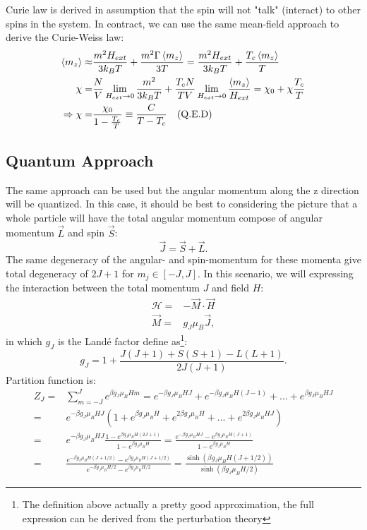 \documentclass[a4paper]{article}
\begin{document}
Curie law is derived in assumption that the spin will not "talk" (interact) to other spins in the system. In contract, we can use the same mean-field approach to derive the Curie-Weiss law:
\begin{align}
	\ev{m_z} \approx& \frac{m^2 H_{ext}}{3k_B T} + \frac{m^2 \Gamma \ev{m_z}}{3T} = \frac{m^2 H_{ext}}{3k_B T} + \frac{T_c\ev{m_z}}{T}\nonumber\\
	\chi =& \frac{N}{V} \lim_{H_{ext} \to 0} \frac{m^2}{3k_B T} + \frac{T_c N}{T V}\lim_{H_{ext} \to 0} \frac{\ev{m_z}}{H_{ext}} = \chi_0 + \chi \frac{T_c}{T}\nonumber\\
	\Rightarrow \chi =& \frac{\chi_0}{1-\frac{T_c}{T}} \equiv \frac{C}{T - T_c} \quad \text{(Q.E.D)}
\end{align} 
\subsection{Quantum Approach}
\quad The same approach can be used but the angular momentum along the z direction will be quantized. In this case, it should be best to considering the picture that a whole particle will have the total angular momentum compose of angular momentum \(\vec{L}\) and spin \(\vec{S}\):
\begin{equation}
	\vec{J} = \vec{S} + \vec{L}.
\end{equation}
\quad The same degeneracy of the angular- and spin-momentum for these momenta give total degeneracy of \(2J + 1\) for \(m_j \in [-J,J]\). In this scenario, we will expressing the interaction between the total momentum \(J\) and field \(H\):
\begin{align}
	\mathcal{H} =& - \vec{M}\cdot\vec{H}\\
	\vec{M} =& g_J \mu_B \vec{J},
\end{align}
in which \(g_J\) is the Landé factor define as\footnote{The definition above actually a pretty good approximation, the full expression can be derived from the perturbation theory}:
\begin{equation}
	g_J = 1 + \frac{J(J+1) + S(S+1) - L(L+1)}{2J(J+1)}.
\end{equation}
\quad Partition function is:
\begin{align}
	Z_J =& \sum_{m = -J}^{J} e^{\beta g_J \mu_B H m} = e^{ - \beta g_J \mu_B H J} + e^{ - \beta g_J \mu_B H (J-1)} + ... + e^{\beta g_J \mu_B H J}\nonumber\\
	=& e^{ - \beta g_J \mu_B H J} (1 + e^{ \beta g_J \mu_B H} + e^{ 2\beta g_J \mu_B H} + ... + e^{ 2\beta g_J \mu_B H J})\nonumber\\
	=& e^{ - \beta g_J \mu_B H J} \frac{1 - e^{\beta g_J \mu_B H(2J + 1)}}{1 - e^{\beta g_J \mu_B H}} = \frac{e^{ - \beta g_J \mu_B H J} - e^{\beta g_J \mu_B H(J+1)}}{1 - e^{\beta g_J \mu_B H}} \nonumber\\
	=& \frac{e^{ - \beta g_J \mu_B H (J + 1/2)} - e^{\beta g_J \mu_B H(J + 1/2)}}{e^{-\beta g_J \mu_B H/2} - e^{\beta g_J \mu_B H/2}} = \frac{\sinh(\beta g_J \mu_B H (J + 1/2))}{\sinh(\beta g_J \mu_B H/2)}
\end{align}
\end{document}
